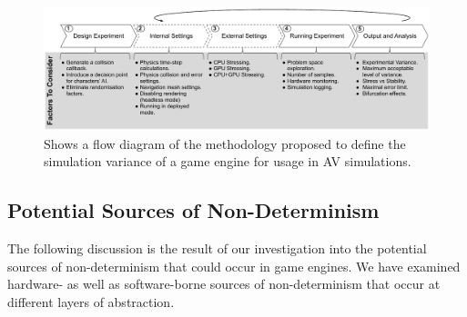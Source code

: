 \documentclass[letterpaper, 10 pt, journal, twoside]{IEEEtran}
\begin{document}

\begin{figure}[b]
    \centering
    \includegraphics[width=0.99\linewidth]{Other/Figures/MethodologyDiagram.pdf}
    \caption{Shows a flow diagram of the methodology proposed to define the simulation variance of a game engine for usage in AV simulations.}

    \label{method_diagram}
\end{figure}

\subsection{Potential Sources of Non-Determinism} \label{s:nondeterminisimSources}

The following discussion is the result of our investigation into the potential sources of non-determinism that could occur in game engines. We have examined hardware- as well as software-borne sources of non-determinism that occur at different layers of abstraction. 

\medskip

\end{document}
